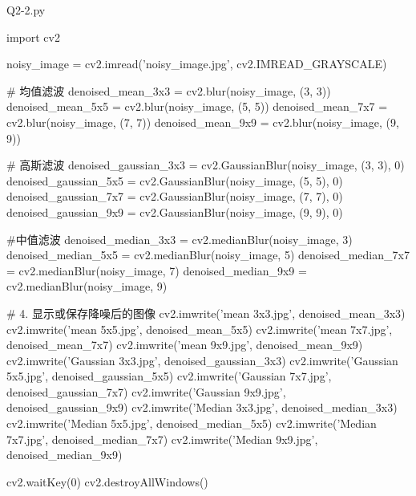 \documentclass[11pt]{article}
\begin{document}
\newpage
\begin{large}
    \noindent Q2-2.py
\end{large}
\begin{python}
import cv2

noisy_image = cv2.imread('noisy_image.jpg', cv2.IMREAD_GRAYSCALE)

# 均值滤波
denoised_mean_3x3 = cv2.blur(noisy_image, (3, 3))
denoised_mean_5x5 = cv2.blur(noisy_image, (5, 5))
denoised_mean_7x7 = cv2.blur(noisy_image, (7, 7))
denoised_mean_9x9 = cv2.blur(noisy_image, (9, 9))

# 高斯滤波
denoised_gaussian_3x3 = cv2.GaussianBlur(noisy_image, (3, 3), 0)
denoised_gaussian_5x5 = cv2.GaussianBlur(noisy_image, (5, 5), 0)
denoised_gaussian_7x7 = cv2.GaussianBlur(noisy_image, (7, 7), 0)
denoised_gaussian_9x9 = cv2.GaussianBlur(noisy_image, (9, 9), 0)

#中值滤波
denoised_median_3x3 = cv2.medianBlur(noisy_image, 3)
denoised_median_5x5 = cv2.medianBlur(noisy_image, 5)
denoised_median_7x7 = cv2.medianBlur(noisy_image, 7)
denoised_median_9x9 = cv2.medianBlur(noisy_image, 9)

# 4. 显示或保存降噪后的图像
cv2.imwrite('mean 3x3.jpg', denoised_mean_3x3)
cv2.imwrite('mean 5x5.jpg', denoised_mean_5x5)
cv2.imwrite('mean 7x7.jpg', denoised_mean_7x7)
cv2.imwrite('mean 9x9.jpg', denoised_mean_9x9)
cv2.imwrite('Gaussian 3x3.jpg', denoised_gaussian_3x3)
cv2.imwrite('Gaussian 5x5.jpg', denoised_gaussian_5x5)
cv2.imwrite('Gaussian 7x7.jpg', denoised_gaussian_7x7)
cv2.imwrite('Gaussian 9x9.jpg', denoised_gaussian_9x9)
cv2.imwrite('Median 3x3.jpg', denoised_median_3x3)
cv2.imwrite('Median 5x5.jpg', denoised_median_5x5)
cv2.imwrite('Median 7x7.jpg', denoised_median_7x7)
cv2.imwrite('Median 9x9.jpg', denoised_median_9x9)

cv2.waitKey(0)
cv2.destroyAllWindows()
\end{python}
\end{document}
